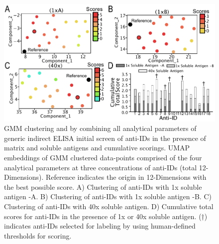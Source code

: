 \begin{figure}[H]
 \centering
 \includegraphics{graphics/ch3/Figure_6.pdf}
 \caption{GMM clustering and by combining all analytical parameters of generic indirect ELISA initial screen of anti-IDs in the presence of matrix and soluble antigens and cumulative scorings. UMAP embeddings of GMM clustered data-points comprised of the four analytical parameters at three concentrations of anti-IDs (total 12-Dimensions). Reference indicates the origin in 12-Dimensions with the best possible score.  A) Clustering of anti-IDs with 1x soluble antigen -A.  B) Clustering of anti-IDs with 1x soluble antigen -B.  C) Clustering of anti-IDs with 40x soluble antigen.  D) Cumulative total scores for anti-IDs in the presence of 1x or 40x soluble antigen.  (†) indicates anti-IDs selected for labeling by using human-defined thresholds for scoring.}
 \end{figure}

